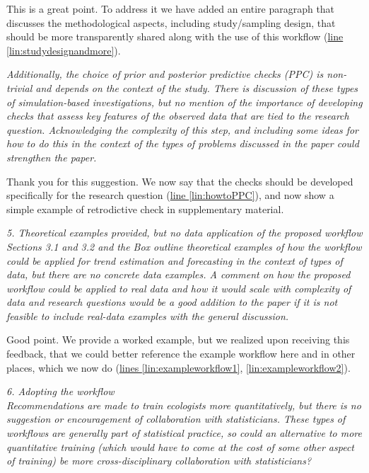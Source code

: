 \documentclass[11pt,letter]{article}
\begin{document}
This is a great point. To address it we have added an entire paragraph that discusses the methodological aspects, including study/sampling design, that should be more transparently shared along with the use of this workflow (\href{file:forecastflows_r1\#lintarget:studydesignandmore}{line \ref*{lin:studydesignandmore}}).

\begin{mybox}
\emph{Additionally, the choice of prior and posterior predictive checks (PPC) is non-trivial and depends on the context of the study. There is discussion of these types of simulation-based investigations, but no mention of the importance of developing checks that assess key features of the observed data that are tied to the research question. Acknowledging the complexity of this step, and including some ideas for how to do this in the context of the types of problems discussed in the paper could strengthen the paper.}
\end{mybox}

Thank you for this suggestion. We now say that the checks should be developed specifically for the research question (\href{file:forecastflows_r1\#lintarget:howtoPPC}{line \ref*{lin:howtoPPC}}), and now show a simple example of retrodictive check in supplementary material.

\begin{mybox}
\emph{5. Theoretical examples provided, but no data application of the proposed workflow\\
Sections 3.1 and 3.2 and the Box outline theoretical examples of how the workflow could be applied for trend estimation and forecasting in the context of types of data, but there are no concrete data examples. A comment on how the proposed workflow could be applied to real data and how it would scale with complexity of data and research questions would be a good addition to the paper if it is not feasible to include real-data examples with the general discussion.}
\end{mybox}

Good point. We provide a worked example, but we realized upon receiving this feedback, that we could better reference the example workflow here and in other places, which we now do (\href{file:forecastflows_r1\#lintarget:exampleworkflow1}{lines \ref*{lin:exampleworkflow1}}, \href{file:forecastflows_r1\#lintarget:exampleworkflow2}{\ref*{lin:exampleworkflow2}}).

\begin{mybox}
\emph{6. Adopting the workflow\\
Recommendations are made to train ecologists more quantitatively, but there is no suggestion or encouragement of collaboration with statisticians. These types of workflows are generally part of statistical practice, so could an alternative to more quantitative training (which would have to come at the cost of some other aspect of training) be more cross-disciplinary collaboration with statisticians?}
\end{mybox}
\end{document}
